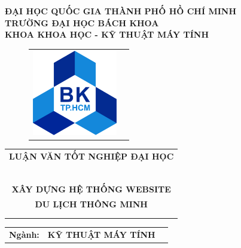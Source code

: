 \documentclass[12pt,a4paper]{report}
\begin{document}
\begin{titlepage}
\begin{center}
	\textbf{
	\large{
		ĐẠI HỌC QUỐC GIA THÀNH PHỐ HỒ CHÍ MINH \\
		TRƯỜNG ĐẠI HỌC BÁCH KHOA \\
		KHOA KHOA HỌC - KỸ THUẬT MÁY TÍNH 
	}}
\end{center}
\vspace{0.5cm}
\begin{figure}[h!]
\begin{center}
\begin{tabular}{cc}
\includegraphics[width=3.7cm]{image/logo/hcmut.png}     
\end{tabular}
\end{center}
\end{figure}
\vspace{0.5cm}
\begin{center}
\begin{tabular}{c}
\multicolumn{1}{c}{\textbf{{\Large LUẬN VĂN TỐT NGHIỆP ĐẠI HỌC}}}\\
~~\\
\hline
\\
\multicolumn{1}{c}{\textbf{{\Large XÂY DỰNG HỆ THỐNG WEBSITE  }}}\\
\textbf{{\Large DU LỊCH THÔNG MINH}}\\\\
\hline
\\
\end{tabular}
 \begin{tabular}{lll}
        \textbf{Ngành:} & \textbf{KỸ THUẬT MÁY TÍNH}\\

\end{tabular}
\end{center}
\end{titlepage}
\end{document}
